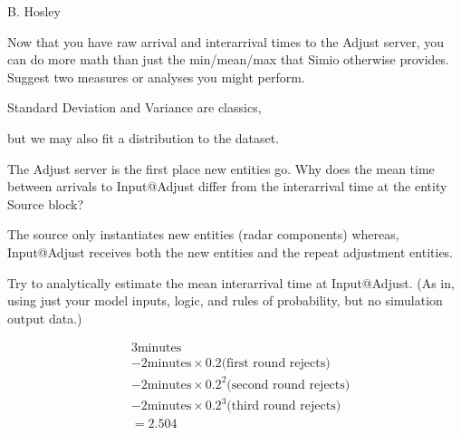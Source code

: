 \documentclass[answers]{exam}
\begin{document}
\hspace{\fill} {\large B. Hosley}
\bigskip

\begin{questions}

\question 
Now that you have raw arrival and interarrival times to the Adjust server, you can do more math than just the min/mean/max that Simio otherwise provides. Suggest two measures or analyses you might perform.
\begin{solution}
	Standard Deviation and Variance are classics,
	
	but we may also fit a distribution to the dataset.
\end{solution}

\question 
The Adjust server is the first place new entities go. Why does the mean time between arrivals to Input@Adjust differ from the interarrival time at the entity Source block?
\begin{solution}
	The source only instantiates new entities (radar components)
	whereas, Input@Adjust receives both the new entities and the repeat adjustment entities.
\end{solution}

\question 
Try to analytically estimate the mean interarrival time at Input@Adjust. (As in, using just your model inputs, logic, and rules of probability, but no simulation output data.)
\begin{solution}
	\begin{align*}
		&3   \text{minutes} \\
		&- 2 \text{minutes} \times 0.2   \text{(first round rejects)}  \\
		&- 2 \text{minutes} \times 0.2^2 \text{(second round rejects)} \\
		&- 2 \text{minutes} \times 0.2^3 \text{(third round rejects)}  \\
		&= 2.504
	\end{align*}
	
\end{solution}

\end{questions}
\end{document}
